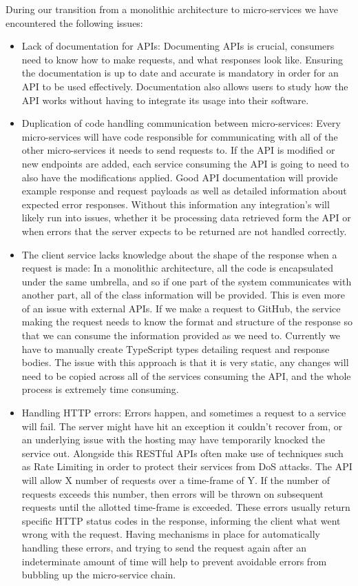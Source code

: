 During our transition from a monolithic architecture to micro-services we have encountered the following issues:
\begin{itemize}
  \item Lack of documentation for APIs: Documenting APIs is crucial, consumers need to know how to make requests, and what responses look like. Ensuring the documentation is up to date and accurate is mandatory in order for an API to be used effectively. Documentation also allows users to study how the API works without having to integrate its usage into their software. 
  \item Duplication of code handling communication between micro-services: Every micro-services will have code responsible for communicating with all of the other micro-services it needs to send requests to. If the API is modified or new endpoints are added, each service consuming the API is going to need to also have the modifications applied. Good API documentation will provide example response and request payloads as well as detailed information about expected error responses. Without this information any integration's will likely run into issues, whether it be processing data retrieved form the API or when errors that the server expects to be returned are not handled correctly. 
  \item The client service lacks knowledge about the shape of the response when a request is made: In a monolithic architecture, all the code is encapsulated under the same umbrella, and so if one part of the system communicates with another part, all of the class information will be provided. This is even more of an issue with external APIs. If we make a request to GitHub, the service making the request needs to know the format and structure of the response so that we can consume the information provided as we need to. Currently we have to manually create TypeScript types detailing request and response bodies. The issue with this approach is that it is very static, any changes will need to be copied across all of the services consuming the API, and the whole process is extremely time consuming.
  \item Handling HTTP errors: Errors happen, and sometimes a request to a service will fail. The server might have hit an exception it couldn't recover from, or an underlying issue with the hosting may have temporarily knocked the service out. Alongside this RESTful APIs often make use of techniques such as Rate Limiting in order to protect their services from DoS attacks. The API will allow X number of requests over a time-frame of Y. If the number of requests exceeds this number, then errors will be thrown on subsequent requests until the allotted time-frame is exceeded. 
  These errors usually return specific HTTP status codes in the response, informing the client what went wrong with the request. Having mechanisms in place for automatically handling these errors, and trying to send the request again after an indeterminate amount of time will help to prevent avoidable errors from bubbling up the micro-service chain.
\end{itemize}

